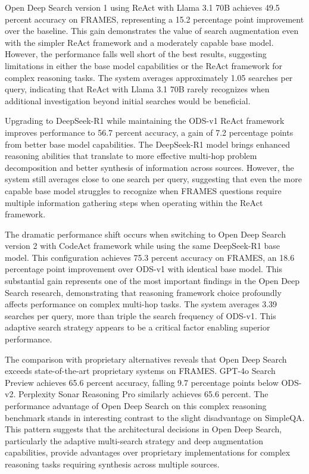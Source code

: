 Open Deep Search version 1 using ReAct with Llama 3.1 70B achieves 49.5 percent accuracy on FRAMES, representing a 15.2 percentage point improvement over the baseline. This gain demonstrates the value of search augmentation even with the simpler ReAct framework and a moderately capable base model. However, the performance falls well short of the best results, suggesting limitations in either the base model capabilities or the ReAct framework for complex reasoning tasks. The system averages approximately 1.05 searches per query, indicating that ReAct with Llama 3.1 70B rarely recognizes when additional investigation beyond initial searches would be beneficial.

Upgrading to DeepSeek-R1 while maintaining the ODS-v1 ReAct framework improves performance to 56.7 percent accuracy, a gain of 7.2 percentage points from better base model capabilities. The DeepSeek-R1 model brings enhanced reasoning abilities that translate to more effective multi-hop problem decomposition and better synthesis of information across sources. However, the system still averages close to one search per query, suggesting that even the more capable base model struggles to recognize when FRAMES questions require multiple information gathering steps when operating within the ReAct framework.

The dramatic performance shift occurs when switching to Open Deep Search version 2 with CodeAct framework while using the same DeepSeek-R1 base model. This configuration achieves 75.3 percent accuracy on FRAMES, an 18.6 percentage point improvement over ODS-v1 with identical base model. This substantial gain represents one of the most important findings in the Open Deep Search research, demonstrating that reasoning framework choice profoundly affects performance on complex multi-hop tasks. The system averages 3.39 searches per query, more than triple the search frequency of ODS-v1. This adaptive search strategy appears to be a critical factor enabling superior performance.

The comparison with proprietary alternatives reveals that Open Deep Search exceeds state-of-the-art proprietary systems on FRAMES. GPT-4o Search Preview achieves 65.6 percent accuracy, falling 9.7 percentage points below ODS-v2. Perplexity Sonar Reasoning Pro similarly achieves 65.6 percent. The performance advantage of Open Deep Search on this complex reasoning benchmark stands in interesting contrast to the slight disadvantage on SimpleQA. This pattern suggests that the architectural decisions in Open Deep Search, particularly the adaptive multi-search strategy and deep augmentation capabilities, provide advantages over proprietary implementations for complex reasoning tasks requiring synthesis across multiple sources.


